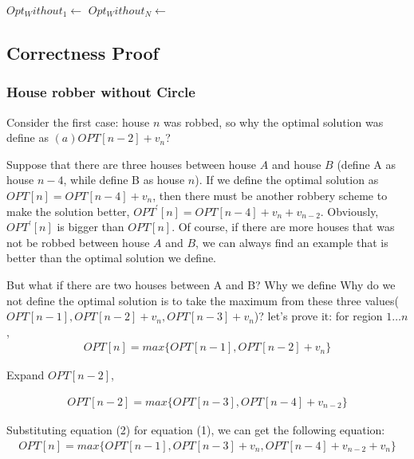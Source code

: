 \documentclass[UTF8,a4paper,12pt]{article}
\begin{document}
\begin{CJK}{UTF8}{gkai}
\begin{algorithm}[htb]
\begin{algorithmic}[1]
				\State $ Opt_Without_1 \gets$  					\State $ Opt_Without_N \gets$  
				\State \Return  {}
			\EndFunction
			
		\end{algorithmic}
	\end{algorithm}

	\subsection{Correctness Proof}
	\subsubsection{House robber without Circle}
		Consider the first case: house $ n $ was robbed, so why the optimal solution was define as $ (a) OPT[n-2] + v_{n}$?
		
		Suppose that there are three houses between house $A $ and house $B $ (define A as house $n-4$, while define B as house $ n $). If we define the optimal solution as $ OPT[n] = OPT[n-4] + v_{n} $, then there must be another robbery scheme to make the solution better, $ OPT^{'}[n] = OPT[n-4] + v_{n} + v_{n-2} $. Obviously, $ OPT^{'}[n] $ is bigger than $ OPT[n] $. Of course, if there are more houses that was not be robbed between house $ A $ and $ B $, we can always find an example that is better than the optimal solution we define.
		
		But what if there are two houses between A and B? Why we define Why do we not define the optimal solution is to take the maximum from these three values($OPT[n-1] , OPT[n-2] + v_{n} , OPT[n-3] + v_{n} $)? let's prove it: for region $ 1 \dots n $, 
		\begin{align}
			OPT[n] = max\{OPT[n-1], OPT[n-2] + v_{n} \}
		\end{align}
		
		Expand $ OPT[n-2] $, 
		
		\begin{align}
			OPT[n-2] = max\{OPT[n-3], OPT[n-4] + v_{n-2} \}
		\end{align}
		
		Substituting equation (2) for equation (1), we can get the following equation:
		\begin{align}
		OPT[n] = max\{OPT[n-1], OPT[n-3] + v_{n}, OPT[n-4] + v_{n-2} + v_{n} \}
		\end{align}
		

\end{CJK}
\end{document}
